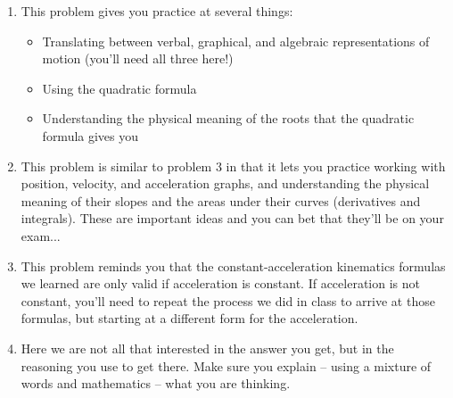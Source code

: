 \documentclass[12pt]{article}
\begin{document}
\begin{enumerate}
{\begin{itemize}
\end{itemize}
}

\item{This problem gives you practice at several things:}
\begin{itemize}
\item{Translating between verbal, graphical, and algebraic representations of motion (you'll need all three here!)}
\item{Using the quadratic formula}
\item{Understanding the physical meaning of the roots that the quadratic formula gives you}
\end{itemize}

\item{This problem is similar to problem 3 in that it lets you practice working with position, velocity, and acceleration graphs, and 
understanding the physical meaning of their slopes and the areas under their curves (derivatives and integrals). These are important
ideas and you can bet that they'll be on your exam...}

\item{This problem reminds you that the constant-acceleration kinematics formulas we learned are only valid if acceleration is constant.
If acceleration is not constant, you'll need to repeat the process we did in class to arrive at those formulas, but starting 
at a different form for the acceleration.}

\item Here we are not all that interested in the answer you get, but in the reasoning you use to get there. Make sure you explain -- using a mixture of words and mathematics -- what you are thinking.

\end{enumerate}
\end{document}
